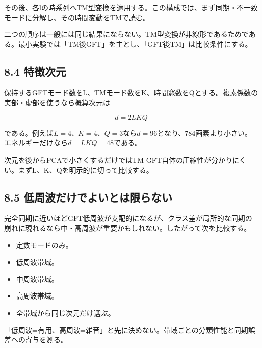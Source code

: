 \documentclass[11pt,a4paper]{ltjsarticle}
\begin{document}
その後、各lの時系列へTM型変換を適用する。この構成では、まず同期・不一致モードに分解し、その時間変動をTMで読む。\par

二つの順序は一般には同じ結果にならない。TM型変換が非線形であるためである。最小実験では「TM後GFT」を主とし、「GFT後TM」は比較条件にする。\par

\subsection*{\textcolor{researchblue}{8.4 特徴次元}}

保持するGFTモード数をL、TMモード数をK、時間窓数をQとする。複素係数の実部・虚部を使うなら概算次元は\par

\[
d=2LKQ
\]

である。例えば\(L=4\)、\(K=4\)、\(Q=3\)なら\(d=96\)となり、784画素より小さい。エネルギーだけなら\(d=LKQ=48\)である。\par

次元を後からPCAで小さくするだけではTM-GFT自体の圧縮性が分かりにくい。まずL、K、Qを明示的に切って比較する。\par

\subsection*{\textcolor{researchblue}{8.5 低周波だけでよいとは限らない}}

完全同期に近いほどGFT低周波が支配的になるが、クラス差が局所的な同期の崩れに現れるなら中・高周波が重要かもしれない。したがって次を比較する。\par

\begin{itemize}

\item 定数モードのみ。

\item 低周波帯域。

\item 中周波帯域。

\item 高周波帯域。

\item 全帯域から同じ次元だけ選ぶ。

\end{itemize}

「低周波=有用、高周波=雑音」と先に決めない。帯域ごとの分類性能と同期誤差への寄与を測る。\par
\end{document}
